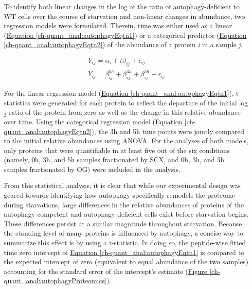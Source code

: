 To identify both linear changes in the log of the ratio of autophagy-deficient to WT cells over the course of starvation and non-linear changes in abundance, two regression models were formulated. Therein, time was either used as a linear (\hyperref[ch-quant_anal:autophagyEqtn1]{Equation \ref{ch-quant_anal:autophagyEqtn1}}) or a categorical predictor (\hyperref[ch-quant_anal:autophagyEqtn2]{Equation \ref{ch-quant_anal:autophagyEqtn2}}) of the abundance of a protein \textit{i} in a sample \textit{j}.

\begin{subequations}
\begin{align}
Y_{ij} = \alpha_{i} + t\beta_{ij} + \epsilon_{ij} \label{ch-quant_anal:autophagyEqtn1}\\
Y_{ij} = \beta^{0h}_{ij} + \beta^{3h}_{ij} + \beta^{5h}_{ij} + \epsilon_{ij} \label{ch-quant_anal:autophagyEqtn2}
\end{align}
\end{subequations}

For the linear regression model (\hyperref[ch-quant_anal:autophagyEqtn1]{Equation \ref{ch-quant_anal:autophagyEqtn1}}), t-statistics were generated for each protein to reflect the departure of the initial log$_2$-ratio of the protein from zero as well as the change in this relative abundance over time. Using the categorical regression model (\hyperref[ch-quant_anal:autophagyEqtn2]{Equation \ref{ch-quant_anal:autophagyEqtn2}}), the 3h and 5h time points were jointly compared to the initial relative abundances using ANOVA. For the analyses of both models, only proteins that were quantifiable in at least five out of the six conditions (namely, 0h, 3h, and 5h samples fractionated by SCX, and 0h, 3h, and 5h samples fractionated by OG) were included in the analysis. 

From this statistical analysis, it is clear that while our experimental design was geared towards identifying how autophagy specifically remodels the proteome during starvations, large differences in the relative abundances of proteins of the autophagy-competent and autophagy-deficient cells exist before starvation begins. These differences persist at a similar magnitude throughout starvation.  Because the standing level of many proteins is influenced by autophagy, a concise way to summarize this effect is by using a t-statistic. In doing so, the peptide-wise fitted time zero intercept of \hyperref[ch-quant_anal:autophagyEqtn1]{Equation \ref{ch-quant_anal:autophagyEqtn1}} is compared to the expected intercept of zero (equivalent to equal abundance of the two samples) accounting for the standard error of the intercept's estimate (\hyperref[ch-quant_anal:autophagyProteomics]{Figure \ref{ch-quant_anal:autophagyProteomics}}).

